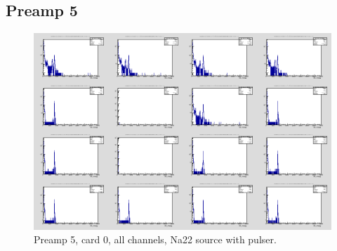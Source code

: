 \documentclass{report}
\begin{document}
\subsection{Preamp 5}
\begin{figure}[!htb]
  \includegraphics[width=\linewidth]{preamp5_lim_energy_card0_all.png}
  \caption{Preamp 5, card 0, all channels, Na22 source  with pulser.}
\end{figure}
\end{document}
